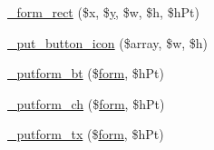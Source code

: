 \begin{DoxyCompactItemize}
\item 
\hyperlink{classform_a8ca61b8c94f947b86a70549feee27296}{\-\_\-form\-\_\-rect} (\$x, \$\hyperlink{example43___m_p_d_f_i__booklet_8php_a3f83be162d14f38451e1bc419fbbbcbc}{y}, \$w, \$h, \$h\-Pt)
\item 
\hyperlink{classform_a683879afd56a7c53a85e303081468e84}{\-\_\-put\-\_\-button\-\_\-icon} (\$array, \$w, \$h)
\item 
\hyperlink{classform_af07b744c445ccf0f0e88d4d37e382765}{\-\_\-putform\-\_\-bt} (\$\hyperlink{classform}{form}, \$h\-Pt)
\item 
\hyperlink{classform_a630a81c3678a369696a2c9256256845e}{\-\_\-putform\-\_\-ch} (\$\hyperlink{classform}{form}, \$h\-Pt)
\item 
\hyperlink{classform_a6bf8c227ca84182b8d6d66e0c1c81ada}{\-\_\-putform\-\_\-tx} (\$\hyperlink{classform}{form}, \$h\-Pt)
\end{DoxyCompactItemize}
